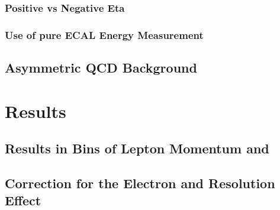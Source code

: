 \subsubsection{Positive vs Negative Eta}
\subsubsection{Use of pure ECAL Energy Measurement}
\subsection{Asymmetric QCD Background}

\section{Results}
\subsection{Results in Bins of Lepton Momentum and \ETm}
\subsection{Correction for the Electron and \ETm Resolution Effect}


